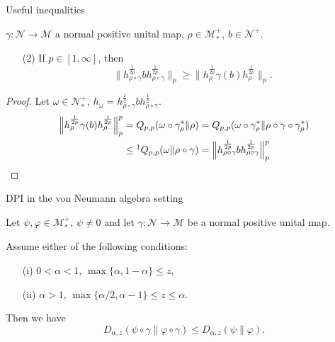 \documentclass[mathserif]{beamer}
\newcommand{\<}{\langle}
\renewcommand{\>}{\rangle}
\newcommand{\Me}{\mathcal M}
\newcommand{\Ne}{\mathcal N}
\begin{document}
\begin{frame}{Useful inequalities}

 $\gamma:\Ne\to \Me$  a normal positive unital map,  $\rho\in \Me_*^+$,  $b\in \Ne^+$. 

\bigskip
\begin{enumerate}
\item[(2)] If $p\in [1,\infty]$, then 
\[
\Big\|h_{\rho\circ\gamma}^{\frac{1}{2p}}bh_{\rho\circ\gamma}^{\frac{1}{2p}}\Big\|_p\ge
\Big\|h_{\rho}^{\frac{1}{2p}}\gamma(b)h_{\rho}^{\frac{1}{2p}}\Big\|_p.
\]
\end{enumerate}

\begin{proof} Let $\omega\in \Ne_*^+$,
$h_\omega=h_{\rho\circ\gamma}^{\frac12}bh_{\rho\circ\gamma}^{\frac12}$.
\begin{align*}
\Big\|h_{\rho}^{\frac{1}{2p}}\gamma(b)h_{\rho}^{\frac{1}{2p}}\Big\|^p_p&=Q_{p,p}(\omega\circ
\gamma^*_\rho\|\rho)=Q_{p,p}(\omega\circ
\gamma^*_\rho\|\rho\circ\gamma\circ\gamma_\rho^*)\\
&\le\footnotemark 
Q_{p,p}(\omega\|\rho\circ\gamma)=\Big\|h_{\rho\circ\gamma}^{\frac{1}{2p}}bh_{\rho\circ\gamma}^{\frac{1}{2p}}\Big\|^p_p
\end{align*}



\end{proof}

\end{frame}


\begin{frame}{DPI in the von Neumann algebra setting}

Let $\psi,\varphi\in \Me_*^+$, $\psi\ne 0$ and let $\gamma:\Ne\to \Me$ be a normal positive
unital map. 

\bigskip 

Assume either of the following conditions:
\medskip

\begin{enumerate}
\item[(i)] $0<\alpha<1$, $\max\{\alpha,1-\alpha\}\le z$,
\item[(ii)] $\alpha>1$, $\max\{\alpha/2,\alpha-1\}\le z\le \alpha$.
\end{enumerate}

\bigskip

Then we have
\[
D_{\alpha,z}(\psi\circ\gamma\|\varphi\circ\gamma)\le D_{\alpha,z}(\psi\|\varphi).
\]

\end{frame}
\end{document}
